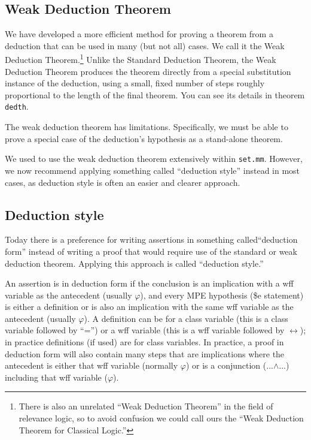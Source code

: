 \subsection{Weak Deduction Theorem}

We have developed
a more efficient method for proving a theorem from a deduction
that can be used in many (but not all) cases.
We call it the
Weak Deduction Theorem.\footnote{
There is also an unrelated ``Weak Deduction Theorem''
in the field of relevance logic, so to avoid confusion we could call
ours the ``Weak Deduction Theorem for Classical Logic.''}
Unlike the Standard Deduction Theorem, the Weak Deduction Theorem produces the
theorem directly from a special substitution instance of the deduction,
using a small, fixed number of steps roughly proportional to the length
of the final theorem.
You can see its details in theorem \texttt{dedth}.

The weak deduction theorem has limitations.
Specifically, we must be able to prove a special case of the deduction's
hypothesis as a stand-alone theorem.

We used to use the weak deduction theorem
extensively within \texttt{set.mm}.
However, we now recommend applying something called ``deduction style''
instead in most cases, as deduction style is
often an easier and clearer approach.

\subsection{Deduction style}

Today there is a preference for writing assertions in
something called``deduction form''
instead of writing a proof that would require use of the standard or
weak deduction theorem. Applying this approach is called
``deduction style.''

An assertion is in deduction form%
if the conclusion is an implication with
a wff variable as the antecedent (usually $\varphi$), and every MPE hypothesis
(\$e statement) is either a definition or is also an implication with
the same wff variable as the antecedent (usually $\varphi$). A definition
can be for a class variable (this is a class variable followed by ``='')
or a wff variable (this is a wff variable followed by $\leftrightarrow$);
in practice
definitions (if used) are for class variables. In practice, a proof
in deduction form will also contain many steps that are implications
where the antecedent is either that wff variable (normally $\varphi$)
or is
a conjunction (...$\land$...) including that wff variable ($\varphi$).

